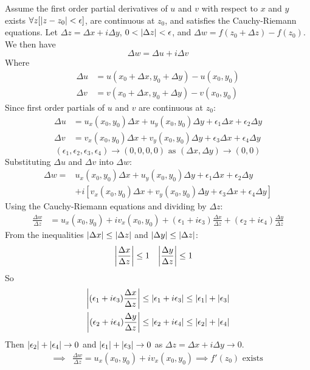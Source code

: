 \documentclass[12pt, english]{book}
\makeatletter
\renewenvironment{proof}[1][\proofname]{\par
	\pushQED{\qed}%
	\normalfont \topsep6\p@\@plus6\p@\relax
	\list{}{%
		\settowidth{\leftmargin}{\itshape\proofname:\hskip\labelsep}%
		\setlength{\labelwidth}{0pt}%
		\setlength{\itemindent}{-\leftmargin}%
		}%
	\item[\hskip\labelsep\itshape#1\@addpunct{:}]\ignorespaces
	}{\popQED\endlist\@endpefalse}
\makeatother
\begin{document}
	\begin{proof}
		Assume the first order partial derivatives of \(u\) and \(v\) with respect to \(x\) and \(y\) exists \(\forall z [\abs{z-z_0}<\epsilon]\), are continuous at \(z_0\), and satisfies the Cauchy-Riemann equations. 
		Let \(\Delta z = \Delta x + i\Delta y\), \(0<\abs{\Delta z}<\epsilon\), and \(\Delta w = f(z_0 + \Delta z) - f(z_0)\).
		We then have \[\Delta w = \Delta u + i\Delta v\]
		Where
		\begin{align*}
			\Delta u &= u(x_0 + \Delta x, y_0 + \Delta y) - u(x_0, y_0) \\
			\Delta v &= v(x_0 + \Delta x, y_0 + \Delta y) - v(x_0, y_0) 
		\end{align*}
		Since first order partials of \(u\) and \(v\) are continuous at \(z_0\):
		\begin{align*}
			\Delta u &= u_x(x_0, y_0)\Delta x + u_y(x_0, y_0)\Delta y + \epsilon_1\Delta x + \epsilon_2 \Delta y \\
			\Delta v &= v_x(x_0, y_0)\Delta x + v_y(x_0, y_0)\Delta y + \epsilon_3\Delta x + \epsilon_4 \Delta y
		\end{align*}
		\[(\epsilon_1, \epsilon_2, \epsilon_3, \epsilon_4) \rightarrow (0,0,0,0) \text{ as } (\Delta x, \Delta y) \rightarrow (0,0)\]
		Substituting \(\Delta u\) and \(\Delta v\) into \(\Delta w\):
		\begin{align*}
			\Delta w 
				=& u_x(x_0, y_0)\Delta x + u_y(x_0, y_0)\Delta y + \epsilon_1\Delta x + \epsilon_2 \Delta y \\
				&+ i[v_x(x_0, y_0)\Delta x + v_y(x_0, y_0)\Delta y + \epsilon_3\Delta x + \epsilon_4 \Delta y]
		\end{align*}
		Using the Cauchy-Riemann equations and dividing by \(\Delta z\):
		\begin{align*}
			\frac{\Delta w}{\Delta z}
			&= u_x(x_0, y_0) + iv_x(x_0, y_0) + (\epsilon_1 + i\epsilon_3) \frac{\Delta x}{\Delta z} + (\epsilon_2 + i\epsilon_4) \frac{\Delta y}{\Delta z}
		\end{align*}
		From the inequalities \(\abs{\Delta x} \leq \abs{\Delta z}\) and \(\abs{\Delta y} \leq \abs{\Delta z}\):
		\begin{align*}
			\abs{\frac{\Delta x}{\Delta z}} &\leq 1		&
			\abs{\frac{\Delta y}{\Delta z}} &\leq 1	
		\end{align*}
		So
		\begin{align*}
			\abs{(\epsilon_1 + i\epsilon_3 )\frac{\Delta x}{\Delta z}} 
				&\leq \abs{\epsilon_1 + i \epsilon_3} \leq \abs{\epsilon_1} + \abs{\epsilon_3} \\
			\abs{(\epsilon_2 + i\epsilon_4 )\frac{\Delta y}{\Delta z}} 
				&\leq \abs{\epsilon_2 + i \epsilon_4} \leq \abs{\epsilon_2} + \abs{\epsilon_4}
		\end{align*}
		Then \(\abs{\epsilon_2} + \abs{\epsilon_4} \rightarrow 0\) and \(\abs{\epsilon_1} + \abs{\epsilon_3} \rightarrow 0\) as \(\Delta z = \Delta x + i\Delta y \rightarrow 0\).
		\begin{align*}
			\implies& \frac{\Delta w}{\Delta z} = u_x(x_0, y_0) + iv_x(x_0, y_0) 
			\implies f'(z_0) \text{ exists}
		\end{align*}
	\end{proof}
\end{document}
